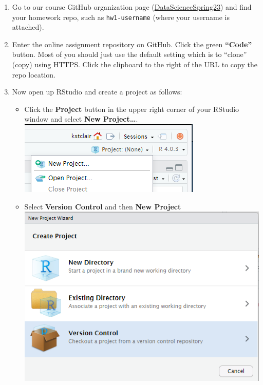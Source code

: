 \documentclass[
]{book}
\providecommand{\tightlist}{%
  \setlength{\itemsep}{0pt}\setlength{\parskip}{0pt}}
\begin{document}
\begin{enumerate}
\def\labelenumi{\arabic{enumi}.}
\item
  Go to our course GitHub organization page
  (\href{https://github.com/DataScienceSpring23}{DataScienceSpring23}) and find your homework repo, such as \texttt{hw1-username} (where your username is attached).
\item
  Enter the online assignment repository on GitHub. Click the green
  \textbf{``Code''} button. Most of you should just use the default setting
  which is to ``clone'' (copy) using HTTPS. Click the clipboard to the
  right of the URL to copy the repo location.
\item
  Now open up RStudio and create a project as follows:

  \begin{itemize}
  \tightlist
  \item
    Click the \textbf{Project} button in the upper right corner of your RStudio window and select \textbf{New Project\ldots{}}.
    \includegraphics{img/maize_project.png}
  \item
    Select \textbf{Version Control} and then \textbf{New Project}
    \includegraphics{img/maize_version.png}

\end{itemize}
\end{enumerate}
\end{document}
